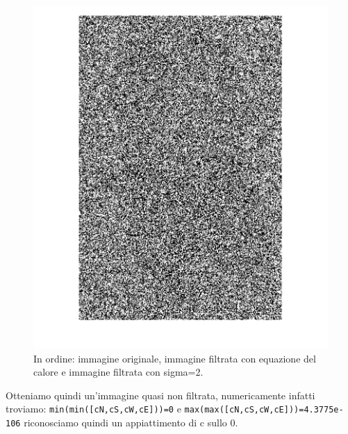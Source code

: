 \begin{figure}[htb]
\includegraphics[scale=0.15,trim={3cm 0cm 3cm 0cm},clip]{Pictures/Esempi di utilizzo/Esempio 5/ami_calore_sigma2_deltat0_2_resize.png}
\caption{In ordine: immagine originale, immagine filtrata con equazione del calore e immagine filtrata con sigma=2.}\label{fig:figura}
\end{figure} 
Otteniamo quindi un'immagine quasi non filtrata, numericamente infatti troviamo:
\texttt{min(min([cN,cS,cW,cE]))=0} e \texttt{max(max([cN,cS,cW,cE]))=4.3775e-106}
riconosciamo quindi un appiattimento di c sullo 0.